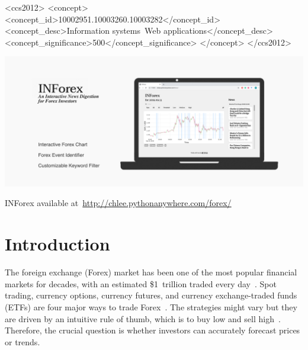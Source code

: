 \documentclass[sigconf]{acmart}
\begin{document}
\begin{CCSXML}
<ccs2012>
   <concept>
       <concept_id>10002951.10003260.10003282</concept_id>
       <concept_desc>Information systems~Web applications</concept_desc>
       <concept_significance>500</concept_significance>
       </concept>
 </ccs2012>
\end{CCSXML}




\begin{teaserfigure}
  \includegraphics[width=\textwidth]{teaser.pdf}
  \caption{INForex available at~\url{http://chlee.pythonanywhere.com/forex/}}
  \Description{}
  \label{fig:teaser}
\end{teaserfigure}


\maketitle

\section{Introduction}
The foreign exchange (Forex) market has been one of the most popular financial
markets for decades, with an estimated \$1\ trillion traded every
day~\cite{YAO200079}.
Spot trading, currency options, currency futures, and currency exchange-traded
funds (ETFs) are four major ways to trade Forex~\cite{TradeForex}.
The strategies might vary but they are driven by an intuitive rule of thumb,
which is to buy low and sell high~\cite{KOOLEN2014144,Zervos11}.
Therefore, the crucial question is whether investors can accurately forecast 
prices or trends.
\end{document}
